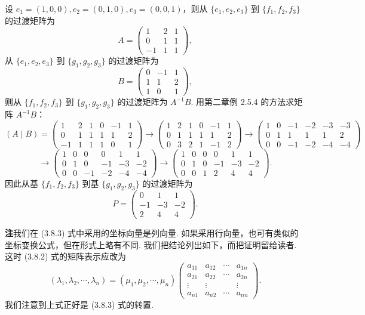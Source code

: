 \documentclass[UTF8,12pt,a4paper,fontset=fandol]{ctexart}
\begin{document}
设 $e_1=(1,0,0),e_2=(0,1,0),e_3=(0,0,1)$，则从 $\{e_1,e_2,e_3\}$ 到 $\{f_1,f_2,f_3\}$ 的过渡矩阵为
\[
A=\left(\begin{array}{rrr}
1&2&1\\
0&1&1\\
-1&1&1
\end{array}\right),
\]
从 $\{e_1,e_2,e_3\}$ 到 $\{g_1,g_2,g_3\}$ 的过渡矩阵为
\[
B=\left(\begin{array}{rrr}
0&-1&1\\
1&1&2\\
1&0&1
\end{array}\right),
\]
则从 $\{f_1,f_2,f_3\}$ 到 $\{g_1,g_2,g_3\}$ 的过渡矩阵为 $A^{-1}B$. 用第二章例 2.5.4 的方法求矩阵 $A^{-1}B$：
\[
(A\mid B)=
\left(\begin{array}{rrr|rrr}
1&2&1&0&-1&1\\
0&1&1&1&1&2\\
-1&1&1&1&0&1
\end{array}\right)
\to
\left(\begin{array}{rrr|rrr}
1&2&1&0&-1&1\\
0&1&1&1&1&2\\
0&3&2&1&-1&2
\end{array}\right)
\to
\left(\begin{array}{rrr|rrr}
1&0&-1&-2&-3&-3\\
0&1&1&1&1&2\\
0&0&-1&-2&-4&-4
\end{array}\right)
\]
\[
\to
\left(\begin{array}{rrr|rrr}
1&0&0&0&1&1\\
0&1&0&-1&-3&-2\\
0&0&-1&-2&-4&-4
\end{array}\right)
\to
\left(\begin{array}{rrr|rrr}
1&0&0&0&1&1\\
0&1&0&-1&-3&-2\\
0&0&1&2&4&4
\end{array}\right).
\]
因此从基 $\{f_1,f_2,f_3\}$ 到基 $\{g_1,g_2,g_3\}$ 的过渡矩阵为
\[
P=\left(\begin{array}{rrr}
0&1&1\\
-1&-3&-2\\
2&4&4
\end{array}\right).
\]

\noindent\textbf{注}\quad 我们在 (3.8.3) 式中采用的坐标向量是列向量. 如果采用行向量，也可有类似的坐标变换公式，但在形式上略有不同. 我们把结论列出如下，而把证明留给读者. 这时 (3.8.2) 式的矩阵表示应改为
\[
(\lambda_1,\lambda_2,\cdots,\lambda_n)=(\mu_1,\mu_2,\cdots,\mu_n)
\left(\begin{array}{cccc}
a_{11}&a_{12}&\cdots&a_{1n}\\
a_{21}&a_{22}&\cdots&a_{2n}\\
\vdots&\vdots&&\vdots\\
a_{n1}&a_{n2}&\cdots&a_{nn}
\end{array}\right).
\]
我们注意到上式正好是 (3.8.3) 式的转置.
\end{document}
